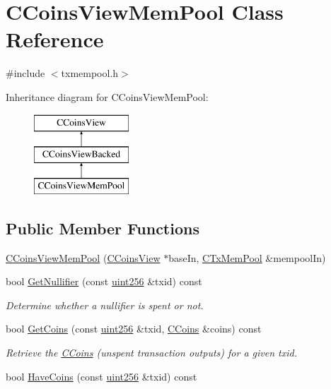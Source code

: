 \hypertarget{class_c_coins_view_mem_pool}{}\section{C\+Coins\+View\+Mem\+Pool Class Reference}
\label{class_c_coins_view_mem_pool}


{\ttfamily \#include $<$txmempool.\+h$>$}

Inheritance diagram for C\+Coins\+View\+Mem\+Pool\+:\begin{figure}[H]
\begin{center}
\leavevmode
\includegraphics[height=3.000000cm]{class_c_coins_view_mem_pool}
\end{center}
\end{figure}
\subsection*{Public Member Functions}
\begin{DoxyCompactItemize}
\item 
\mbox{\hyperlink{class_c_coins_view_mem_pool_aab9a206c304acec322fddf646c7bafb9}{C\+Coins\+View\+Mem\+Pool}} (\mbox{\hyperlink{class_c_coins_view}{C\+Coins\+View}} $\ast$base\+In, \mbox{\hyperlink{class_c_tx_mem_pool}{C\+Tx\+Mem\+Pool}} \&mempool\+In)
\item 
bool \mbox{\hyperlink{class_c_coins_view_mem_pool_ac76524f89eb1a8c25e3c6c3201d3662a}{Get\+Nullifier}} (const \mbox{\hyperlink{classuint256}{uint256}} \&txid) const
\begin{DoxyCompactList}\small\item\em Determine whether a nullifier is spent or not. \end{DoxyCompactList}\item 
bool \mbox{\hyperlink{class_c_coins_view_mem_pool_a1a4a556821b1680ff4b73758c8a1e471}{Get\+Coins}} (const \mbox{\hyperlink{classuint256}{uint256}} \&txid, \mbox{\hyperlink{class_c_coins}{C\+Coins}} \&coins) const
\begin{DoxyCompactList}\small\item\em Retrieve the \mbox{\hyperlink{class_c_coins}{C\+Coins}} (unspent transaction outputs) for a given txid. \end{DoxyCompactList}\item 
bool \mbox{\hyperlink{class_c_coins_view_mem_pool_a2c5900448dc5570053060686ad1f014b}{Have\+Coins}} (const \mbox{\hyperlink{classuint256}{uint256}} \&txid) const
\end{DoxyCompactItemize}
